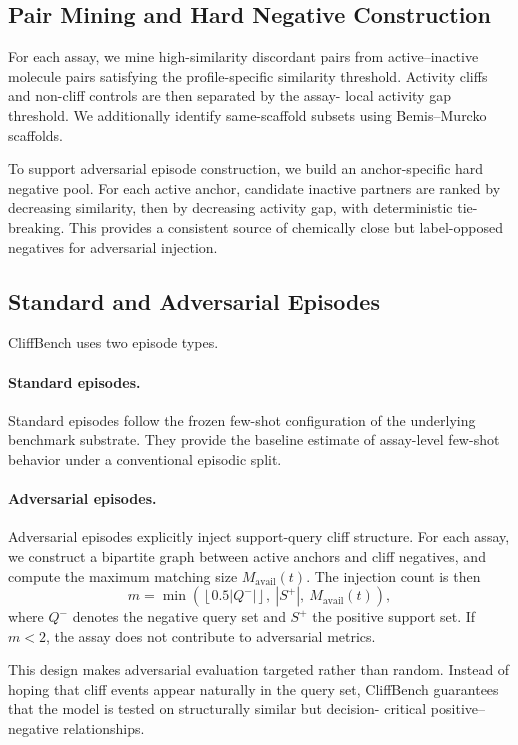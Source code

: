 \documentclass{article}
\begin{document}
\subsection{Pair Mining and Hard Negative Construction}

For each assay, we mine high-similarity discordant pairs from active--inactive molecule pairs satisfying the
profile-specific similarity threshold. Activity cliffs and non-cliff controls are then separated by the assay-
local activity gap threshold. We additionally identify same-scaffold subsets using Bemis--Murcko scaffolds.

To support adversarial episode construction, we build an anchor-specific hard negative pool. For each active
anchor, candidate inactive partners are ranked by decreasing similarity, then by decreasing activity gap, with
deterministic tie-breaking. This provides a consistent source of chemically close but label-opposed negatives for
adversarial injection.

\subsection{Standard and Adversarial Episodes}

CliffBench uses two episode types.

\paragraph{Standard episodes.}
Standard episodes follow the frozen few-shot configuration of the underlying benchmark substrate. They provide the
baseline estimate of assay-level few-shot behavior under a conventional episodic split.

\paragraph{Adversarial episodes.}
Adversarial episodes explicitly inject support-query cliff structure. For each assay, we construct a bipartite
graph between active anchors and cliff negatives, and compute the maximum matching size $M_{\mathrm{avail}}(t)$.
The injection count is then
\[
m = \min\!\left(\left\lfloor 0.5|Q^-| \right\rfloor,\ |S^+|,\ M_{\mathrm{avail}}(t)\right),
\]
where $Q^-$ denotes the negative query set and $S^+$ the positive support set. If $m<2$, the assay does not
contribute to adversarial metrics.

This design makes adversarial evaluation targeted rather than random. Instead of hoping that cliff events appear
naturally in the query set, CliffBench guarantees that the model is tested on structurally similar but decision-
critical positive--negative relationships.
\end{document}

